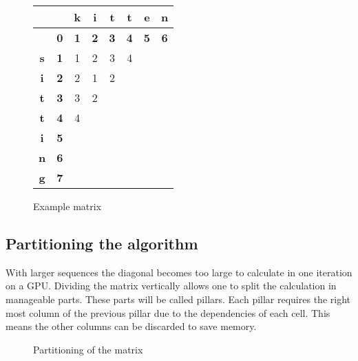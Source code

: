 {\newcommand\C[0]{\cellcolor{gray}}
\begin{figure}[p]
\centering \large
\begin{tabular}{|c|c||c|c|c|c|c|c|} \hline
           &            & \textbf{k} & \textbf{i} & \textbf{t} & \textbf{t} & \textbf{e} & \textbf{n} \\ \hline
           & \textbf{0} & \textbf{1} & \textbf{2} & \textbf{3} & \textbf{4} & \textbf{5} & \textbf{6} \\ \hline \hline
\textbf{s} & \textbf{1} & 1          & 2          & 3          & 4          & \C         &            \\ \hline
\textbf{i} & \textbf{2} & 2          & 1          & 2          & \C         &            &            \\ \hline
\textbf{t} & \textbf{3} & 3          & 2          & \C         &            &            &            \\ \hline
\textbf{t} & \textbf{4} & 4          & \C         &            &            &            &            \\ \hline
\textbf{i} & \textbf{5} & \C         &            &            &            &            &            \\ \hline
\textbf{n} & \textbf{6} &            &            &            &            &            &            \\ \hline
\textbf{g} & \textbf{7} &            &            &            &            &            &            \\ \hline
\end{tabular}
\caption{Example matrix} \label{diagonal}
\end{figure}
}

\subsection{Partitioning the algorithm} \label{partitioning}
With larger sequences the diagonal becomes too large to calculate in one iteration on a GPU.
Dividing the matrix vertically allows one to split the calculation in manageable parts.
These parts will be called pillars.
Each pillar requires the right most column of the previous pillar due to the dependencies of each cell.
This means the other columns can be discarded to save memory.

\begin{figure}[p]
    \centering
    
    \caption{Partitioning of the matrix} \label{division}
\end{figure}

